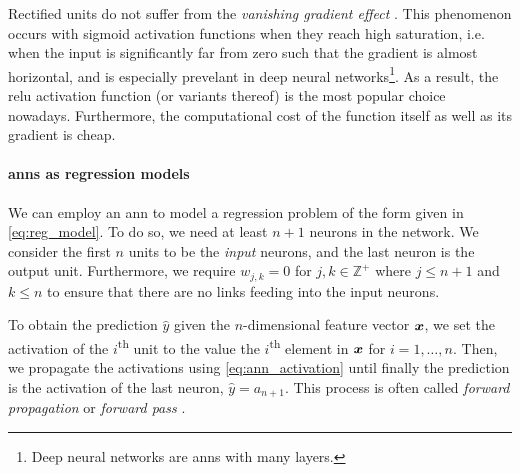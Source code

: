 \documentclass[../main.tex]{subfiles}
\begin{document}
Rectified units do not suffer from the \emph{vanishing gradient effect} \cite{glorot2011}.
This phenomenon occurs with sigmoid activation functions when they reach high saturation, i.e. when the input is significantly far from zero such that the gradient is almost horizontal, and is especially prevelant in deep neural networks\footnote{Deep neural networks are \glspl{ann} with many layers.}.
As a result, the \gls{relu} activation function (or variants thereof) is the most popular choice nowadays.
Furthermore, the computational cost of the function itself as well as its gradient is cheap.

\paragraph{\glspl{ann} as regression models}
We can employ an \gls{ann} to model a regression problem of the form given in \cref{eq:reg_model}. 
To do so, we need at least $n+1$ neurons in the network. 
We consider the first $n$ units to be the \emph{input} neurons, and the last neuron is the output unit.
Furthermore, we require $w_{j,k}=0$ for $j,k \in \mathbb{Z}^+$ where $j \leq n+1$ and $k \leq n$ to ensure that there are no links feeding into the input neurons.

To obtain the prediction $\hat{y}$ given the $n$-dimensional feature vector ${\bm{x}}$, we set the activation of the $i$\textsuperscript{th} unit to the value the $i$\textsuperscript{th} element in ${\bm{x}}$ for $i=1,\dots,n$.
Then, we propagate the activations using \cref{eq:ann_activation} until finally the prediction is the activation of the last neuron, $\hat{y}=a_{n+1}$.
This process is often called \emph{forward propagation} or \emph{forward pass} \cite{burkov2019}.


\end{document}
